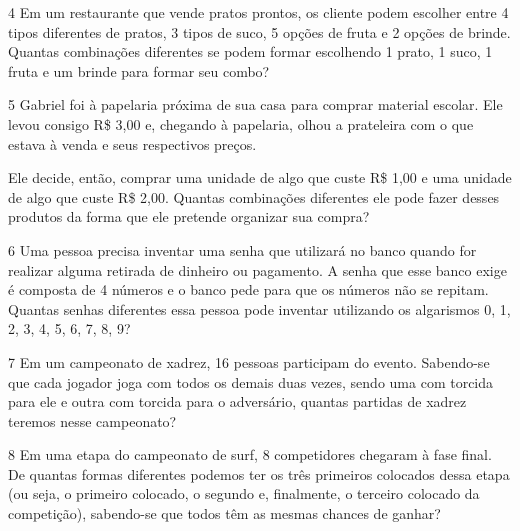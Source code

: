 {\num{4} Em um restaurante que vende pratos prontos, os cliente podem escolher entre 4 tipos diferentes de pratos, 3 tipos de suco, 5 opções de fruta e 2 opções de brinde. Quantas combinações diferentes se podem formar escolhendo 1 prato, 1 suco, 1 fruta e um brinde para
formar seu combo?



\num{5} Gabriel foi à papelaria próxima de sua casa para comprar material
escolar. Ele levou consigo R\$ 3,00 e, chegando à papelaria, olhou a
prateleira com o que estava à venda e seus respectivos preços.


Ele decide, então, comprar uma unidade de algo que custe R\$ 1,00 e uma unidade de
algo que custe R\$ 2,00. Quantas combinações diferentes ele pode fazer
desses produtos da forma que ele pretende organizar sua compra?



\num{6} Uma pessoa precisa inventar uma senha que utilizará no banco quando
for realizar alguma retirada de dinheiro ou pagamento. A senha que esse
banco exige é composta de 4 números e o banco pede para que os números
não se repitam. Quantas senhas diferentes essa pessoa pode inventar
utilizando os algarismos 0, 1, 2, 3, 4, 5, 6, 7, 8, 9?



\num{7} Em um campeonato de xadrez, 16 pessoas participam do evento.
Sabendo-se que cada jogador joga com todos os demais duas vezes, sendo
uma com torcida para ele e outra com torcida para o adversário, quantas
partidas de xadrez teremos nesse campeonato?



\num{8} Em uma etapa do campeonato de surf, 8 competidores chegaram à fase
final. De quantas formas diferentes podemos ter os três primeiros
colocados dessa etapa (ou seja, o primeiro colocado, o segundo e,
finalmente, o terceiro colocado da competição), sabendo-se que todos
têm as mesmas chances de ganhar?

}
